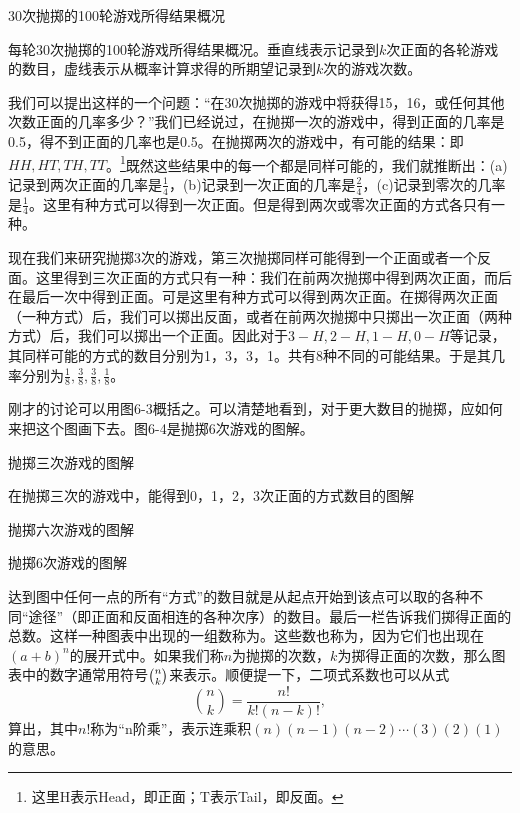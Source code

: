 \documentclass[12pt,oneside]{book}
\begin{document}
\begin{common-format}
\begin{linefig}{30次抛掷的100轮游戏所得结果概况}
\caption{\footnotesize 每轮30次抛掷的100轮游戏所得结果概况。垂直线表示记录到$k$次正面的各轮游戏的数目，虚线表示从概率计算求得的所期望记录到$k$次的游戏次数。}
\label{fig:30次抛掷的100轮游戏所得结果概况}
\end{linefig}

我们可以提出这样的一个问题：“在30次抛掷的游戏中将获得15，16，或任何其他次数正面的几率多少？”我们已经说过，在抛掷一次的游戏中，得到正面的几率是0.5，得不到正面的几率也是0.5。在抛掷两次的游戏中，有可能的结果：即$HH, HT, TH, TT$。\footnote{这里H表示Head，即正面；T表示Tail，即反面。}既然这些结果中的每一个都是同样可能的，我们就推断出：(a)记录到两次正面的几率是$\frac{1}{4}$，(b)记录到一次正面的几率是$\frac{2}{4}$，(c)记录到零次的几率是$\frac{1}{4}$。这里有种方式可以得到一次正面。但是得到两次或零次正面的方式各只有一种。

现在我们来研究抛掷3次的游戏，第三次抛掷同样可能得到一个正面或者一个反面。这里得到三次正面的方式只有一种：我们在前两次抛掷中得到两次正面，而后在最后一次中得到正面。可是这里有种方式可以得到两次正面。在掷得两次正面（一种方式）后，我们可以掷出反面，或者在前两次抛掷中只掷出一次正面（两种方式）后，我们可以掷出一个正面。因此对于$3-H, 2-H, 1-H, 0-H$等记录，其同样可能的方式的数目分别为1，3，3，1。共有8种不同的可能结果。于是其几率分别为$\frac{1}{8}, \frac{3}{8}, \frac{3}{8}, \frac{1}{8} $。

刚才的讨论可以用图6-3概括之。可以清楚地看到，对于更大数目的抛掷，应如何来把这个图画下去。图6-4是抛掷6次游戏的图解。
\begin{fig}{抛掷三次游戏的图解}
\caption{\footnotesize 在抛掷三次的游戏中，能得到0，1，2，3次正面的方式数目的图解}
\label{fig:抛掷三次游戏的图解}
\end{fig}

\begin{fig}{抛掷六次游戏的图解}
\caption{抛掷6次游戏的图解}
\label{fig:抛掷六次游戏的图解}
\end{fig}
达到图中任何一点的所有“方式”的数目就是从起点开始到该点可以取的各种不同“途径”（即正面和反面相连的各种次序）的数目。最后一栏告诉我们掷得正面的总数。这样一种图表中出现的一组数称为。这些数也称为，因为它们也出现在$(a+b)^n$的展开式中。如果我们称$n$为抛掷的次数，$k$为掷得正面的次数，那么图表中的数字通常用符号$\tbinom{n}{k}$来表示。顺便提一下，二项式系数也可以从式
\begin{equation}
\label{Eq:I:6:4}
\binom{n}{k}=\frac{n!}{k!(n-k)!},
\end{equation}
算出，其中$n!$称为“n阶乘”，表示连乘积$(n)(n-1)(n-2)\dotsm(3)(2)(1)$的意思。


\end{common-format}
\end{document}
